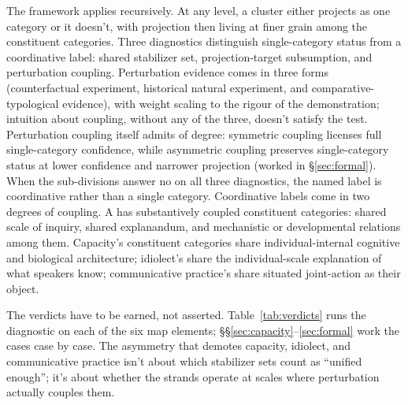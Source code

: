 \documentclass[12pt]{article}
\begin{document}
The framework applies recursively. At any level, a cluster either projects as one category or it doesn't, with projection then living at finer grain among the constituent categories. Three diagnostics distinguish single-category status from a coordinative label: shared stabilizer set, projection-target subsumption, and perturbation coupling. Perturbation evidence comes in three forms (counterfactual experiment, historical natural experiment, and comparative-typological evidence), with weight scaling to the rigour of the demonstration; intuition about coupling, without any of the three, doesn't satisfy the test. Perturbation coupling itself admits of degree: symmetric coupling licenses full single-category confidence, while asymmetric coupling preserves single-category status at lower confidence and narrower projection (worked in §\ref{sec:formal}). When the sub-divisions answer no on all three diagnostics, the named label is coordinative rather than a single category. Coordinative labels come in two degrees of coupling. A  has substantively coupled constituent categories: shared scale of inquiry, shared explanandum, and mechanistic or developmental relations among them. Capacity's constituent categories share individual-internal cognitive and biological architecture; idiolect's share the individual-scale explanation of what speakers know; communicative practice's share situated joint-action as their object.

The verdicts have to be earned, not asserted. Table~\ref{tab:verdicts} runs the diagnostic on each of the six map elements; §§\ref{sec:capacity}--\ref{sec:formal} work the cases case by case. The asymmetry that demotes capacity, idiolect, and communicative practice isn't about which stabilizer sets count as \enquote{unified enough}; it's about whether the strands operate at scales where perturbation actually couples them.
\end{document}
